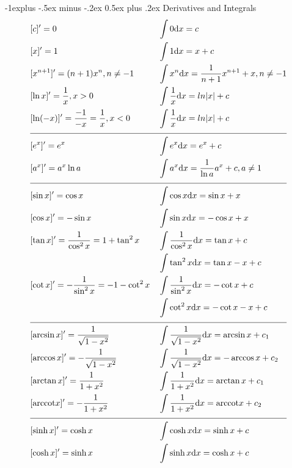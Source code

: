 \documentclass[10pt,landscape]{scrartcl}
\makeatletter
\renewcommand{\subsection}{\@startsection{subsection}{2}{0mm}%
                                {-1explus -.5ex minus -.2ex}%
                                {0.5ex plus .2ex}%
                                {\normalfont\normalsize\bfseries}}
\makeatother
\begin{document}
\begin{multicols*}{2}
\subsection{Derivatives and Integrals}
  \begin{align*}
        &[c]' = 0  &&\int0\mathrm{d}x = c \\
        &[x]' = 1 && \int1 \mathrm{d}x = x+c\\
        &[x^{n+1}]' = (n+1)x^n, n\neq-1 && \int x^n \mathrm{d}x = \frac{1}{n+1}x^{n+1}+x, n\neq -1\\
        &[\ln x]' = \frac{1}{x}, x>0 && \int \frac{1}{x}\mathrm{d}x = ln|x|+c\\
        &[\ln(-x)]' = \frac{-1}{-x}=\frac{1}{x},x<0 &&\int\frac{1}{x}\mathrm{d}x = ln|x|+c \\
        \cline{1-4}
        &[e^x]' = e^x && \int e^x \mathrm{d}x = e^x + c\\
        &[a^x]' = a^x\ln a && \int a^x \mathrm{d}x = \frac{1}{\ln a}a^x + c, a \neq 1\\
        \cline{1-4}
        &[\sin x]' = \cos x && \int \cos x \mathrm{d}x = \sin x + x\\
        &[\cos x]' = -\sin x && \int \sin x \mathrm{d}x = -\cos x + x\\
        &[\tan x]' = \frac{1}{\cos^2 x} = 1 + \tan^2x && \int \frac{1}{\cos^2x}\mathrm{d}x = \tan x + c\\
        & && \int \tan^2x\mathrm{d}x = \tan x - x+ c\\
        &[\cot x]' = -\frac{1}{\sin^2x} = -1-\cot^2x && \int \frac{1}{\sin^2x}\mathrm{d}x = -\cot x + c\\
        & && \int \cot^2x\mathrm{d}x = -\cot x - x + c\\
        \cline{1-4}
        &[\arcsin x]' = \frac{1}{\sqrt{1-x^2}} && \int \frac{1}{\sqrt{1-x^2}} \mathrm{d}x = \arcsin x + c_1\\
        &[\arccos x]' = -\frac{1}{\sqrt{1-x^2}} && \int \frac{1}{\sqrt{1-x^2}} \mathrm{d}x = -\arccos x + c_2\\
        &[\arctan x]' = \frac{1}{1+x^2} && \int \frac{1}{1+x^2} \mathrm{d}x = \arctan x + c_1\\
        &[\mathrm{arccot} x]' = -\frac{1}{1+x^2} && \int \frac{1}{1+x^2} \mathrm{d}x = \mathrm{arccot} x + c_2\\
        \cline{1-4}
        &[\sinh x]' = \cosh x  &&\int \cosh x \mathrm{d}x = \sinh x + c \\
        &[\cosh x]' = \sinh x  &&\int \sinh x \mathrm{d}x = \cosh x  + c \\

\end{align*}
\end{multicols*}
\end{document}

